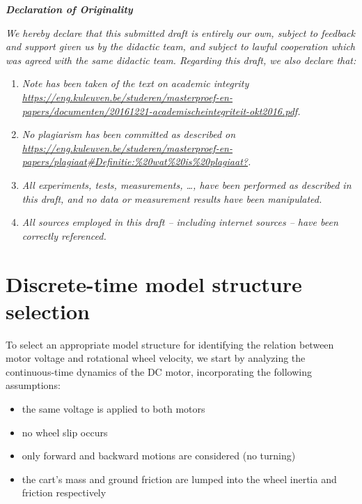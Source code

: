 \documentclass{article}
\begin{document}
	\newpage
	
	\vspace*{3.2cm}\vfill
	
	\begin{center}
		\Large\textbf{\textit{Declaration of Originality}}
	\end{center}
	
	\noindent \textit{We hereby declare that this submitted draft is entirely our own, subject to feedback and support given us by the didactic team, and subject to lawful cooperation which was agreed with the same didactic team. Regarding this draft, we also declare that:}
	
	\begin{enumerate}
		\item \textit{Note has been taken of the text on academic integrity \url{https://eng.kuleuven.be/studeren/masterproef-en-papers/documenten/20161221-academischeintegriteit-okt2016.pdf}.}
		\item \textit{No plagiarism has been committed as described on \url{https://eng.kuleuven.be/studeren/masterproef-en-papers/plagiaat\#Definitie:\%20wat\%20is\%20plagiaat?}.}
		\item \textit{All experiments, tests, measurements, \ldots, have been performed as described in this draft, and no data or measurement results have been manipulated.}
		\item \textit{All sources employed in this draft – including internet sources – have been correctly referenced.}
	\end{enumerate}
	
	\newpage
	
	\section{Discrete-time model structure selection}
	
	To select an appropriate model structure for identifying the relation between motor voltage and rotational wheel velocity, we start by analyzing the continuous-time dynamics of the DC motor, incorporating the following assumptions:
	
	\begin{itemize}
		\item the same voltage is applied to both motors
		\item no wheel slip occurs
		\item only forward and backward motions are considered (no turning)
		\item the cart's mass and ground friction are lumped into the wheel inertia and friction respectively
	\end{itemize}
	
\end{document}
